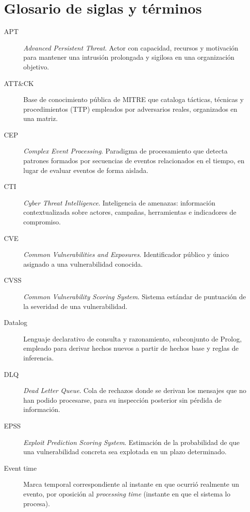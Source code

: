 \chapter*{Glosario de siglas y términos}

\begin{description}

\item[APT] \textit{Advanced Persistent Threat}. Actor con capacidad, recursos y motivación
para mantener una intrusión prolongada y sigilosa en una organización objetivo.

\item[ATT\&CK] Base de conocimiento pública de MITRE que cataloga tácticas, técnicas y
procedimientos (TTP) empleados por adversarios reales, organizados en una matriz.

\item[CEP] \textit{Complex Event Processing}. Paradigma de procesamiento que detecta
patrones formados por secuencias de eventos relacionados en el tiempo, en lugar de evaluar
eventos de forma aislada.

\item[CTI] \textit{Cyber Threat Intelligence}. Inteligencia de amenazas: información
contextualizada sobre actores, campañas, herramientas e indicadores de compromiso.

\item[CVE] \textit{Common Vulnerabilities and Exposures}. Identificador público y único
asignado a una vulnerabilidad conocida.

\item[CVSS] \textit{Common Vulnerability Scoring System}. Sistema estándar de puntuación de
la severidad de una vulnerabilidad.

\item[Datalog] Lenguaje declarativo de consulta y razonamiento, subconjunto de Prolog,
empleado para derivar hechos nuevos a partir de hechos base y reglas de inferencia.

\item[DLQ] \textit{Dead Letter Queue}. Cola de rechazos donde se derivan los mensajes que
no han podido procesarse, para su inspección posterior sin pérdida de información.

\item[EPSS] \textit{Exploit Prediction Scoring System}. Estimación de la probabilidad de
que una vulnerabilidad concreta sea explotada en un plazo determinado.

\item[Event time] Marca temporal correspondiente al instante en que ocurrió realmente un
evento, por oposición al \textit{processing time} (instante en que el sistema lo procesa).


\end{description}

